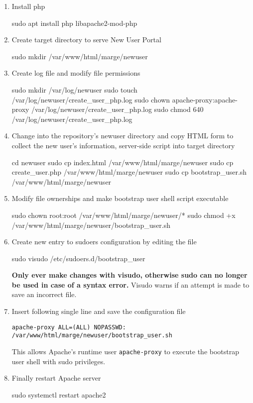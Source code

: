 \begin{enumerate}
    \item Install php 
    \begin{terminal}
        sudo apt install php libapache2-mod-php
    \end{terminal}
    \item Create target directory to serve New User Portal
    \begin{terminal}
        sudo mkdir /var/www/html/marge/newuser
    \end{terminal}
    \item Create log file and modify file permissions
    \begin{terminal}
        sudo mkdir /var/log/newuser
        sudo touch /var/log/newuser/create_user_php.log
        sudo chown apache-proxy:apache-proxy /var/log/newuser/create_user_php.log
        sudo chmod 640 /var/log/newuser/create_user_php.log
    \end{terminal}
    \item Change into the repository's newuser directory and copy HTML form to
    collect the new user's information, server-side script into target directory
    \begin{terminal}
        cd newuser
        sudo cp index.html /var/www/html/marge/newuser
        sudo cp create_user.php /var/www/html/marge/newuser
        sudo cp bootstrap_user.sh /var/www/html/marge/newuser
    \end{terminal}
    \item Modify file ownerships and make bootstrap user shell script executable
    \begin{terminal}
        sudo chown root:root /var/www/html/marge/newuser/*
        sudo chmod +x /var/www/html/marge/newuser/bootstrap_user.sh
    \end{terminal}
    \item Create new entry to sudoers configuration by editing the file
    \begin{terminal}
        sudo visudo /etc/sudoers.d/bootstrap_user
    \end{terminal}
    \textbf{Only ever make changes with visudo, otherwise sudo can no longer be
    used in case of a syntax error.} Visudo warns if an attempt is made to save
    an incorrect file.
    \item Insert following single line and save the configuration file
    \begin{lstlisting}[frame={l}]
        apache-proxy ALL=(ALL) NOPASSWD: /var/www/html/marge/newuser/bootstrap_user.sh
    \end{lstlisting}
    This allows Apache's runtime user \texttt{apache-proxy} to execute the
    bootstrap user shell with sudo privileges.
    \item Finally restart Apache server
    \begin{terminal}
        sudo systemctl restart apache2
    \end{terminal}
\end{enumerate}

